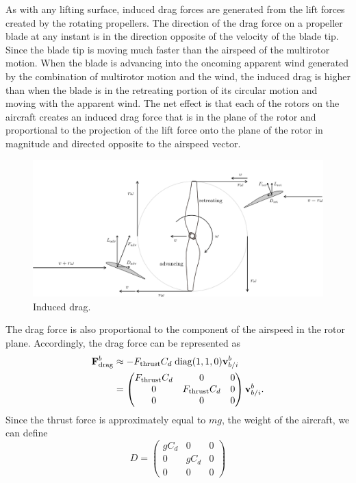 As with any lifting surface, induced drag forces are generated from the lift forces created by the rotating propellers. The direction of the drag force on a propeller blade at any instant is in the direction opposite of the velocity of the blade tip. Since the blade tip is moving much faster than the airspeed of the multirotor motion. When the blade is advancing into the oncoming apparent wind generated by the combination of multirotor motion and the wind, the induced drag is higher than when the blade is in the retreating portion of its circular motion and moving with the apparent wind. The net effect is that each of the rotors on the aircraft creates an induced drag force that is in the plane of the rotor and proportional to the projection of the lift force onto the plane of the rotor in magnitude and directed opposite to the airspeed vector. 
%
\begin{figure}[hhhhtb]
\begin{center}
\includegraphics[width=6.5in]{chap3_multirotor/figures/eom-induced-drag2}
\end{center}
\caption{Induced drag.} \label{fig:eom-induced-drag}
\end{figure}
%
%
The drag force is also proportional to the component of the airspeed in the rotor plane.\cite{MahonyKC12} Accordingly, the drag force can be represented as 
\begin{align*}
	\mathbf{F}_\text{drag}^b &\approx - F_\text{thrust} C_d \; \text{diag}(1,1,0) \mathbf{v}_{b/i}^b \\
	&= \begin{pmatrix} F_\text{thrust}C_d & 0 & 0 \\ 0 & F_\text{thrust}C_d & 0 \\ 0 & 0 & 0 \end{pmatrix}\mathbf{v}_{b/i}^b.
\end{align*}
Since the thrust force is approximately equal to $mg$, the weight of the aircraft, we can define
\[
D = \begin{pmatrix} gC_d & 0 & 0 \\ 0 & gC_d & 0 \\ 0 & 0 & 0 \end{pmatrix}
\]
